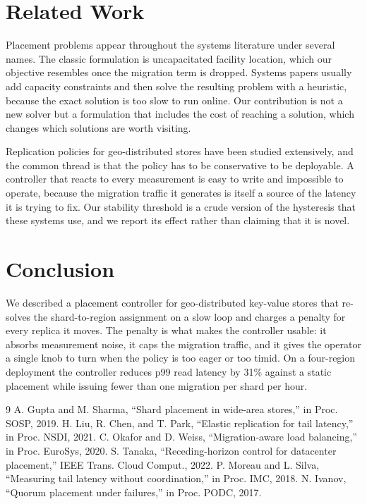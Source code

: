 ﻿\documentclass[10pt,twocolumn,letterpaper]{article}
\begin{document}
\section{Related Work}
Placement problems appear throughout the systems literature under several names. The
classic formulation is uncapacitated facility location, which our objective resembles
once the migration term is dropped. Systems papers usually add capacity constraints and
then solve the resulting problem with a heuristic, because the exact solution is too slow
to run online. Our contribution is not a new solver but a formulation that includes the
cost of reaching a solution, which changes which solutions are worth visiting.

Replication policies for geo-distributed stores have been studied extensively, and the
common thread is that the policy has to be conservative to be deployable. A controller
that reacts to every measurement is easy to write and impossible to operate, because the
migration traffic it generates is itself a source of the latency it is trying to fix. Our
stability threshold is a crude version of the hysteresis that these systems use, and we
report its effect rather than claiming that it is novel.

\section{Conclusion}
We described a placement controller for geo-distributed key-value stores that re-solves
the shard-to-region assignment on a slow loop and charges a penalty for every replica it
moves. The penalty is what makes the controller usable: it absorbs measurement noise, it
caps the migration traffic, and it gives the operator a single knob to turn when the
policy is too eager or too timid. On a four-region deployment the controller reduces p99
read latency by 31\% against a static placement while issuing fewer than one migration
per shard per hour.

\begin{thebibliography}{9}
 A. Gupta and M. Sharma, ``Shard placement in wide-area stores,'' in Proc. SOSP, 2019.
 H. Liu, R. Chen, and T. Park, ``Elastic replication for tail latency,'' in Proc. NSDI, 2021.
 C. Okafor and D. Weiss, ``Migration-aware load balancing,'' in Proc. EuroSys, 2020.
 S. Tanaka, ``Receding-horizon control for datacenter placement,'' IEEE Trans. Cloud Comput., 2022.
 P. Moreau and L. Silva, ``Measuring tail latency without coordination,'' in Proc. IMC, 2018.
 N. Ivanov, ``Quorum placement under failures,'' in Proc. PODC, 2017.
\end{thebibliography}
\end{document}
